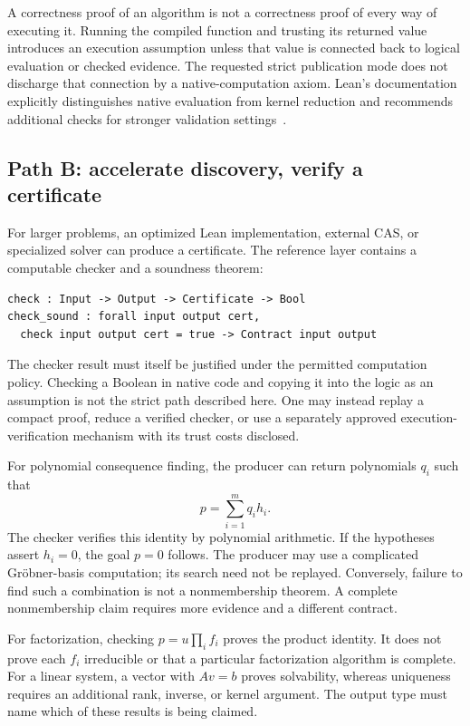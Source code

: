 \documentclass[11pt,a4paper]{article}
\theoremstyle{remark}\newtheorem{example}[proposition]{Example}
\begin{document}
A correctness proof of an algorithm is not a correctness proof of every way of executing it. Running the compiled function and trusting its returned value introduces an execution assumption unless that value is connected back to logical evaluation or checked evidence. The requested strict publication mode does not discharge that connection by a native-computation axiom. Lean's documentation explicitly distinguishes native evaluation from kernel reduction and recommends additional checks for stronger validation settings~\cite{validation,native}.

\subsection{Path B: accelerate discovery, verify a certificate}
For larger problems, an optimized Lean implementation, external CAS, or specialized solver can produce a certificate. The reference layer contains a computable checker and a soundness theorem:
\begin{lstlisting}
check : Input -> Output -> Certificate -> Bool
check_sound : forall input output cert,
  check input output cert = true -> Contract input output
\end{lstlisting}
The checker result must itself be justified under the permitted computation policy. Checking a Boolean in native code and copying it into the logic as an assumption is not the strict path described here. One may instead replay a compact proof, reduce a verified checker, or use a separately approved execution-verification mechanism with its trust costs disclosed.

For polynomial consequence finding, the producer can return polynomials $q_i$ such that
\[
 p=\sum_{i=1}^{m}q_i h_i.
\]
The checker verifies this identity by polynomial arithmetic. If the hypotheses assert $h_i=0$, the goal $p=0$ follows. The producer may use a complicated Gr\"obner-basis computation; its search need not be replayed. Conversely, failure to find such a combination is not a nonmembership theorem. A complete nonmembership claim requires more evidence and a different contract.

For factorization, checking $p=u\prod_i f_i$ proves the product identity. It does not prove each $f_i$ irreducible or that a particular factorization algorithm is complete. For a linear system, a vector with $Av=b$ proves solvability, whereas uniqueness requires an additional rank, inverse, or kernel argument. The output type must name which of these results is being claimed.
\end{document}

